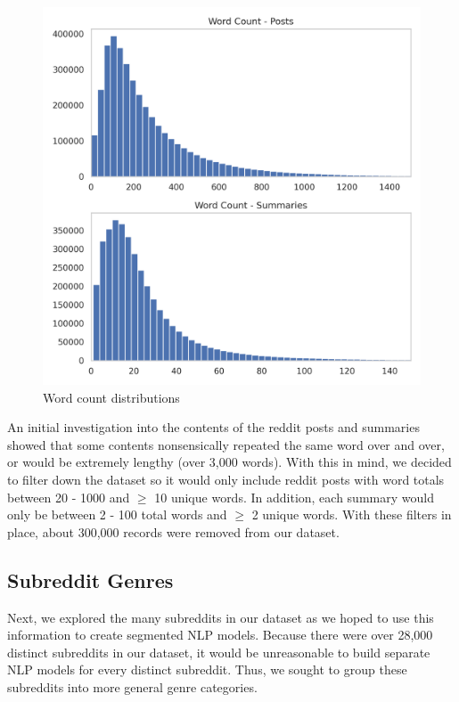 \documentclass[11pt,a4paper, twocolumn]{article}
\begin{document}
\begin{figure}
  \includegraphics[width=\linewidth]{word_counts2.png}
  \caption{Word count distributions}
  \label{fig:word_counts}
\end{figure}

An initial investigation into the contents of the reddit posts and summaries showed that some contents nonsensically repeated 
the same word over and over, or would be extremely lengthy (over 3,000 words). 
With this in mind, we decided to filter down the dataset so it would only include reddit posts 
with word totals between 20 - 1000 and $\geq$ 10 unique words. 
In addition, each summary would only be between 2 - 100 total words and $\geq$ 2 unique words. 
With these filters in place, about 300,000 records were removed from our dataset. 


\subsection{Subreddit Genres}

Next, we explored the many subreddits in our dataset as we hoped to use this information to create segmented NLP models. 
Because there were over 28,000 distinct subreddits in our dataset, it would be unreasonable to build separate NLP models for every distinct subreddit. 
Thus, we sought to group these subreddits into more general genre categories. 
\end{document}
